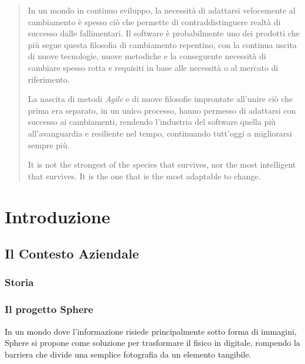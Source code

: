 \documentclass[a4paper,12pt]{report}
\begin{document}
	\begin{abstract}
		In un mondo in continuo sviluppo, la necessità di adattarsi velocemente al cambiamento è spesso
		ciò che permette di contraddistinguere realtà di successo dalle fallimentari.
		Il software è probabilmente uno dei prodotti che più segue questa filosofia di cambiamento repentino,
		con la continua uscita di nuove tecnologie, nuove metodiche e la conseguente necessità di cambiare spesso
		rotta e requisiti in base alle necessità o al mercato di riferimento.
		
		La nascita di metodi \emph{Agile} e di nuove filosofie improntate all'unire ciò che prima era separato,
		in un unico processo, hanno permesso di adattarsi con successo ai cambiamenti, rendendo l'industria del
		software quella più all'avanguardia e resiliente nel tempo, continuando tutt'oggi a migliorarsi sempre più.
		
 		\begin{fquote}
		 	It is not the strongest of the species that survives, nor the most intelligent that survives.
		 	It is the one that is the most adaptable to change.
	 	\end{fquote}
	\end{abstract}

	\tableofcontents
	
	\chapter{Introduzione}
	
	\section{Il Contesto Aziendale}
	
		\subsection{Storia}
		
			\lipsum[1]
		
		\subsection{Il progetto Sphere}
		
			In un mondo dove l'informazione risiede principalmente sotto forma di immagini, Sphere si propone come soluzione per trasformare il fisico in digitale, rompendo la barriera che divide una semplice fotografia da un 
			elemento tangibile.
			
\end{document}

